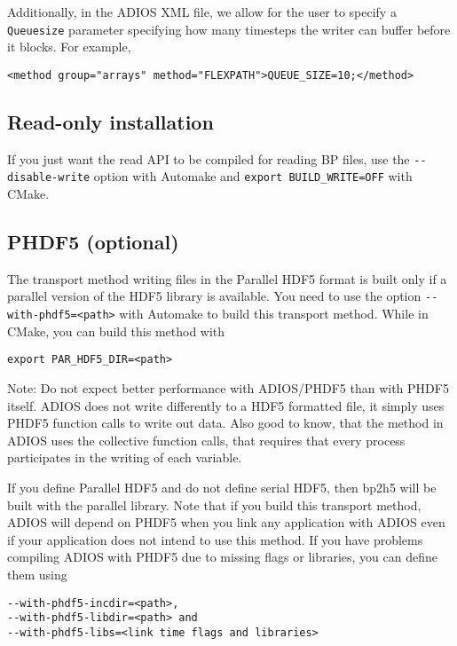 Additionally, in the ADIOS XML file, we allow for the user to specify a \verb+Queuesize+ parameter specifying how many timesteps the writer can buffer before it blocks. For example, 

\begin{lstlisting}
<method group="arrays" method="FLEXPATH">QUEUE_SIZE=10;</method>
\end{lstlisting}



\subsection{Read-only installation}

If you just want the read API to be compiled for reading BP files, use the \verb+--disable-write+ option with Automake and \verb+export BUILD_WRITE=OFF+ with CMake.

\subsection{PHDF5 (optional)}

The transport method writing files in the Parallel HDF5 format is built only if 
a parallel version of the HDF5 library is available. You need to use the 
option \verb+--with-phdf5=<path>+ with Automake to build this transport method. 
While in CMake, you can build this method with
\begin{lstlisting}
export PAR_HDF5_DIR=<path>
\end{lstlisting}

Note: Do not expect better performance with ADIOS/PHDF5 than with PHDF5 itself. ADIOS does not write differently to a HDF5 formatted file, it simply uses PHDF5 function calls to write out data. Also good to know, that the method in ADIOS uses the collective function calls, that requires that every process participates in the writing of each variable. 

If you define Parallel HDF5 and do not define serial HDF5, then bp2h5 will be built 
with the parallel library. 
Note that if you build this transport method, ADIOS will depend on PHDF5 when you 
link any application with ADIOS even if your application does not intend to 
use this method. 
If you have problems compiling ADIOS with PHDF5 due to missing flags or libraries, 
you can define them using 

\begin{lstlisting}
--with-phdf5-incdir=<path>,
--with-phdf5-libdir=<path> and 
--with-phdf5-libs=<link time flags and libraries>
\end{lstlisting}

